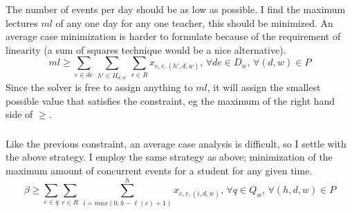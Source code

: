 \documentclass{article}
\begin{document}
    \subsubsection{}
    The number of events per day should be as low as possible.
    I find the maximum lectures $ml$ of any one day for any one teacher, this should be minimized.
    An average case minimization is harder to formulate because of the requirement of linearity (a sum of squares technique would be a nice alternative).
    \[ml \geq \sum_{e \in de} \, \sum_{h' \in H_{d,w}} \, \sum_{r \in R} x_{e,r,(h',d,w)}, \, \forall de \in D_w, \, \forall (d,w) \in P\]
    Since the solver is free to assign anything to $ml$, it will assign the smallest possible value that satisfies the constraint, eg the maximum of the right hand side of $\geq$.
    \subsubsection{}
    Like the previous constraint, an average case analysis is difficult, so I settle with the above strategy.
    I employ the same strategy as above; minimization of the maximum amount of concurrent events for a student for any given time.
    \[\beta \geq \sum_{e \in q} \sum_{r \in R} \, \sum^h_{i=max(0, h - \ell(e) + 1)} x_{e,r,(i,d,w)}, \, \forall q \in Q_w , \, \forall (h,d,w) \in P \]
\end{document}
